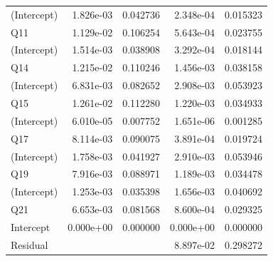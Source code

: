 \documentclass[11pt,a4paper]{report}
\begin{document}
\begin{table}
\begin{tabular}{@{\extracolsep{5pt}}lrrrr}
(Intercept) & 1.826e-03  & 0.042736          	&2.348e-04 &0.015323 \\
Q11         & 1.129e-02  & 0.106254      &5.643e-04 &0.023755 \\[0.3cm]

(Intercept) & 1.514e-03  & 0.038908          	&3.292e-04 &0.018144 \\ 
Q14         & 1.215e-02  & 0.110246      &1.456e-03 &0.038158 \\[0.3cm]

(Intercept)& 6.831e-03  & 0.082652          	&2.908e-03 &0.053923 \\  
Q15         & 1.261e-02  & 0.112280      &1.220e-03 &0.034933 \\[0.3cm]

(Intercept) & 6.010e-05  & 0.007752          	&1.651e-06 &0.001285 \\ 
Q17        & 8.114e-03  & 0.090075    	&3.891e-04 &0.019724 \\[0.3cm]

(Intercept) & 1.758e-03  & 0.041927 		  	&2.910e-03 & 0.053946 \\
Q19         & 7.916e-03  & 0.088971  	&1.189e-03 & 0.034478 \\[0.3cm]

(Intercept) & 1.253e-03 & 0.035398  			& 1.656e-03 & 0.040692 \\ 
Q21         & 6.653e-03 & 0.081568       &8.600e-04 & 0.029325  \\[0.3cm]

Intercept   & 0.000e+00  & 0.000000          	&0.000e+00 &0.000000 \\[0.3cm]     
   
Residual &				& 			 			& 8.897e-02 & 0.298272 \\[0.3cm]
\hline \hline
\end{tabular}     
\end{table}
\end{document}
